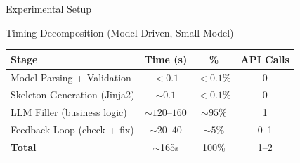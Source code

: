 \documentclass[10pt,aspectratio=169]{beamer}
\begin{document}
\begin{frame}{Experimental Setup}
\begin{block}{Timing Decomposition (Model-Driven, Small Model)}
\begin{center}
\setlength{\tabcolsep}{8pt}
\begin{tabular}{lccc}
\toprule
\textbf{Stage} & \textbf{Time (s)} & \textbf{\%} & \textbf{API Calls} \\
\midrule
Model Parsing + Validation       & $<0.1$ & $<0.1\%$ & 0 \\
Skeleton Generation (Jinja2)     & $\sim0.1$ & $<0.1\%$ & 0 \\
LLM Filler (business logic)      & $\sim120$--$160$ & $\sim95\%$ & 1 \\
Feedback Loop (check + fix)      & $\sim20$--$40$ & $\sim5\%$ & 0--1 \\
\midrule
\textbf{Total} & $\sim$165s & 100\% & 1--2 \\
\bottomrule
\end{tabular}
\end{center}
\end{block}

\end{frame}

\end{document}
